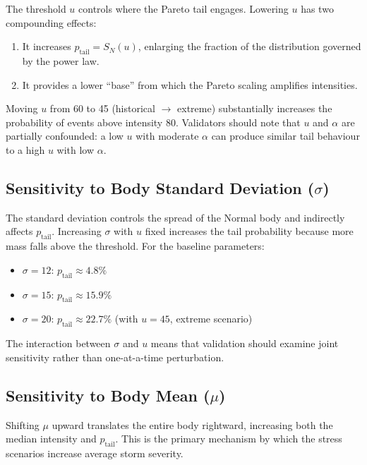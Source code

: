 \documentclass[11pt,a4paper]{article}
\begin{document}
The threshold $u$ controls where the Pareto tail engages. Lowering $u$ has two
compounding effects:
\begin{enumerate}[nosep]
    \item It increases $p_{\text{tail}} = S_N(u)$, enlarging the fraction of the
          distribution governed by the power law.
    \item It provides a lower ``base'' from which the Pareto scaling amplifies
          intensities.
\end{enumerate}

\noindent Moving $u$ from 60 to 45 (historical $\to$ extreme) substantially
increases the probability of events above intensity 80. Validators should note that
$u$ and $\alpha$ are partially confounded: a low $u$ with moderate $\alpha$ can
produce similar tail behaviour to a high $u$ with low $\alpha$.

\subsection{Sensitivity to Body Standard Deviation ($\sigma$)}

The standard deviation controls the spread of the Normal body and indirectly affects
$p_{\text{tail}}$. Increasing $\sigma$ with $u$ fixed increases the tail probability
because more mass falls above the threshold. For the baseline parameters:

\begin{itemize}[nosep]
    \item $\sigma = 12$: $p_{\text{tail}} \approx 4.8\%$
    \item $\sigma = 15$: $p_{\text{tail}} \approx 15.9\%$
    \item $\sigma = 20$: $p_{\text{tail}} \approx 22.7\%$ (with $u=45$, extreme scenario)
\end{itemize}

\noindent The interaction between $\sigma$ and $u$ means that validation should
examine joint sensitivity rather than one-at-a-time perturbation.

\subsection{Sensitivity to Body Mean ($\mu$)}

Shifting $\mu$ upward translates the entire body rightward, increasing both the
median intensity and $p_{\text{tail}}$. This is the primary mechanism by which the
stress scenarios increase average storm severity.
\end{document}

